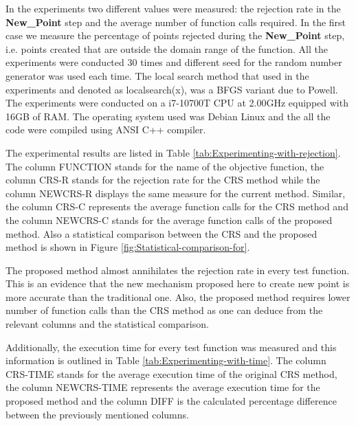 \documentclass[symmetry,article,submit,moreauthors,pdftex]{Definitions/mdpi}
\begin{document}
In the experiments two different values were measured: the rejection
rate in the\textbf{ New\_Point} step and the average number of function
calls required. In the first case we measure the percentage of points
rejected during the\textbf{ New\_Point} step, i.e. points created
that are outside the domain range of the function. All the experiments
were conducted 30 times and different seed for the random number generator
was used each time. The local search method that used in the experiments
and denoted as localsearch(x), was a BFGS variant due to Powell\cite{powell}. The experiments were conducted on a  i7-10700T CPU at 2.00GHz equipped with 16GB of RAM. The operating system used was Debian Linux and the all the code were compiled using ANSI C++ compiler.

The experimental results are listed in Table \ref{tab:Experimenting-with-rejection}.
The column FUNCTION stands for the name of the objective function,
the column CRS-R stands for the rejection rate\textbf{ }for the CRS
method while the column NEWCRS-R displays  the same measure for the
current method. Similar, the column CRS-C represents the average
function calls for the CRS method and the column NEWCRS-C stands for
the average function calls of the proposed method. Also a statistical
comparison between the CRS and the proposed method is shown in Figure
\ref{fig:Statistical-comparison-for}.

The proposed method almost annihilates the rejection rate in every
test function. This is an evidence that the new mechanism proposed
here to create new point is more accurate than the traditional one.
Also, the proposed method requires lower number of function calls
than the CRS method as one can deduce from the relevant columns and
the statistical comparison.

Additionally, the execution time for every test function was measured and this information  is outlined in Table \ref{tab:Experimenting-with-time}. The column CRS-TIME stands for the average execution time of the original CRS method, the column NEWCRS-TIME represents the average execution time for the proposed method and the column DIFF is the calculated percentage difference between the previously mentioned columns. 
\end{document}
